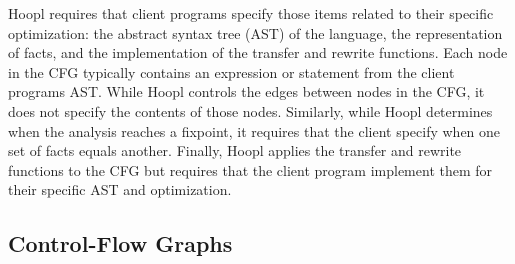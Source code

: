 \documentclass[12pt]{report}
\begin{document}

Hoopl requires that client programs specify those items related to
their specific optimization: the abstract syntax tree (AST) of the
language, the representation of facts, and the implementation of the
transfer and rewrite functions. Each node in the CFG typically
contains an expression or statement from the client programs
AST. While Hoopl controls the edges between nodes in the CFG, it does
not specify the contents of those nodes. Similarly, while Hoopl
determines when the analysis reaches a fixpoint, it requires that the
client specify when one set of facts equals another. Finally, Hoopl
applies the transfer and rewrite functions to the CFG but requires
that the client program implement them for their specific AST and
optimization.

\subsection*{Control-Flow Graphs}
\end{document}
